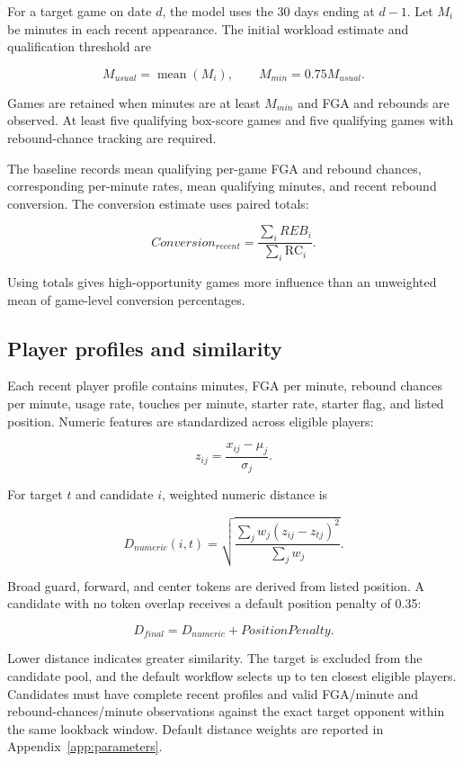 \documentclass[11pt]{article}
\newcommand{\RC}{\mathrm{RC}}
\begin{document}
For a target game on date $d$, the model uses the 30 days ending at $d-1$.
Let $M_i$ be minutes in each recent appearance. The initial workload estimate
and qualification threshold are

\[
M_{usual}=\operatorname{mean}(M_i), \qquad
M_{min}=0.75M_{usual}.
\]

Games are retained when minutes are at least $M_{min}$
and FGA and rebounds are observed. At least five qualifying box-score games
and five qualifying games with rebound-chance tracking are required.

The baseline records mean qualifying per-game FGA and rebound chances,
corresponding per-minute rates, mean qualifying minutes, and recent rebound
conversion. The
conversion estimate uses paired totals:

\[
Conversion_{recent}=
\frac{\sum_i REB_i}{\sum_i \RC_i}.
\]

Using totals gives high-opportunity games more influence than an unweighted
mean of game-level conversion percentages.

\subsection{Player profiles and similarity}

Each recent player profile contains minutes, FGA per minute, rebound chances
per minute, usage rate, touches per minute, starter rate, starter flag, and
listed position. Numeric features are standardized across eligible players:

\[
z_{ij}=\frac{x_{ij}-\mu_j}{\sigma_j}.
\]

For target $t$ and candidate $i$, weighted numeric distance is

\[
D_{numeric}(i,t)=
\sqrt{
\frac{\sum_j w_j(z_{ij}-z_{tj})^2}
     {\sum_j w_j}
}.
\]

Broad guard, forward, and center tokens are derived from listed position. A
candidate with no token overlap receives a default position penalty of 0.35:

\[
D_{final}=D_{numeric}+PositionPenalty.
\]

Lower distance indicates greater similarity. The target is excluded from the
candidate pool, and the default workflow selects up to ten closest eligible
players. Candidates must have complete recent profiles and valid FGA/minute
and rebound-chances/minute observations against the exact target opponent
within the same lookback window. Default distance weights are reported in
Appendix~\ref{app:parameters}.
\end{document}

